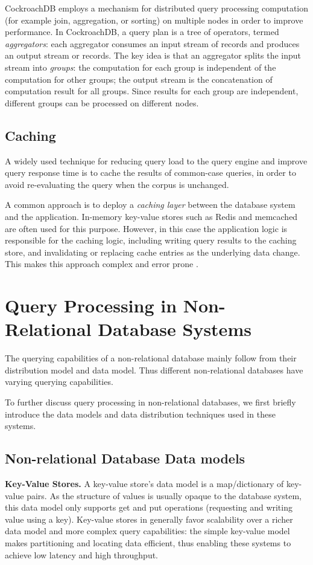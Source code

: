 CockroachDB employs a mechanism for distributed query processing computation \cite{cockroachdb:distsql}
(for example join, aggregation, or sorting) on multiple nodes in order to improve performance.
In CockroachDB, a query plan is a tree of operators, termed \textit{aggregators}:
each aggregator consumes an input stream of records and produces an output stream or records.
The key idea is that an aggregator splits the input stream into \textit{groups}:
the computation for each group is independent of the computation for other groups; the output stream is the
concatenation of computation result for all groups.
Since results for each group are independent, different groups can be processed on different nodes.

\subsection{Caching}
\label{sec:caching}
A widely used technique for reducing query load to the query engine and improve query response time is to cache
the results of common-case queries,
in order to avoid re-evaluating the query when the corpus is unchanged.

A common approach is to deploy a \textit{caching layer} between the database system and the application.
In-memory key-value stores such as Redis \cite{redis:cache} and memcached \cite{memcached:wiki} are often used for this
purpose.
However, in this case the application logic is responsible for the caching logic,
including writing query results to the caching store, and invalidating or replacing cache entries as the underlying data change.
This makes this approach complex and error prone \cite{kate:pequod}.

\section{Query Processing in Non-Relational Database Systems}
\label{sec:qp_non_relational}

The querying capabilities of a non-relational database mainly follow from their distribution model and data model.
Thus different non-relational databases have varying querying capabilities.

To further discuss query processing in non-relational databases,
we first briefly introduce the data models and data distribution techniques used in these systems.

\subsection{Non-relational Database Data models}
\noindent
\textbf{Key-Value Stores.}
A key-value store's data model is a map/dictionary of key-value pairs.
As the structure of values is usually opaque to the database system, this data model only supports get and put operations
(requesting and writing value using a key).
Key-value stores in generally favor scalability over a richer data model and more complex query capabilities:
the simple key-value model makes partitioning and locating data efficient, thus enabling these systems to achieve low
latency and high throughput.

